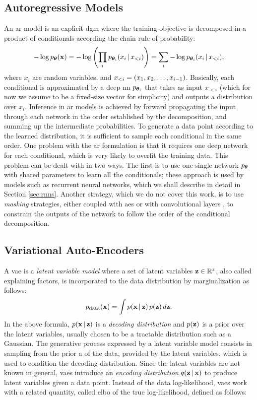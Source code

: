 \subsection{Autoregressive Models}\label{sec:autoregressive}
An \gls{ar} model is an explicit \gls{dgm} where the training objective is decomposed in a product of conditionals according the chain rule of probability:
$$-\log p_{\Param}(\Vector{x}) = -\log\Paren{\prod_i p_{\Param_i}(x_i \given x_{<i})} = \sum_i -\log p_{\Param_i}(x_i \given x_{<i}),$$
where $x_i$ are random variables, and $x_{<i} = \left( x_1, x_2, \ldots, x_{i-1} \right)$. Basically, each conditional is approximated by a deep \gls{nn} $p_{\boldsymbol{\theta}_i}$ that takes as input $x_{<i}$ (which for now we assume to be a fixed-size vector for simplicity) and outputs a distribution over $x_i$. Inference in \gls{ar} models is achieved by forward propagating the input through each network in the order established by the decomposition, and summing up the intermediate probabilities. To generate a data point according to the learned distribution, it is sufficient to sample each conditional in the same order. One problem with the \gls{ar} formulation is that it requires one deep network for each conditional, which is very likely to overfit the training data. This problem can be dealt with in two ways. The first is to use one single network  $p_{\boldsymbol{\theta}}$ with shared parameters to learn all the conditionals; these approach is used by models such as recurrent neural networks, which we shall describe in detail in Section \ref{sec:rnns}. Another strategy, which we do not cover this work, is to use \emph{masking} strategies, either coupled with \glspl{ae} \cite{?} or with convolutional layers \cite{?}, to constrain the outputs of the network to follow the order of the conditional decomposition.

\subsection{Variational Auto-Encoders}
A \gls{vae} is a \emph{latent variable model} where a set of latent variables $\Vector{z} \in \Real^z$, also called explaining factors, is incorporated to the data distribution by marginalization as follows:
$$\PData(\Vector{x}) = \int p(\Vector{x} \given \Vector{z})\,p(\Vector{z})\, d\Vector{z}.$$
In the above formula, $p(\Vector{x} \given \Vector{z})$ is a \emph{decoding distribution} and $p(\Vector{z})$ is a prior over the latent variables, usually chosen to be a tractable distribution such as a Gaussian. The generative process expressed by a latent variable model consists in sampling from the prior a  of the data, provided by the latent variables, which is used to condition the decoding distribution. Since the latent variables are not known in general, \glspl{vae} introduce an \emph{encoding distribution} $q(\Vector{z} \given \Vector{x})$ to produce latent variables given a data point. Instead of the data log-likelihood, \glspl{vae} work with a related quantity, called \gls{elbo} of the true log-likelihood, defined as follows:

